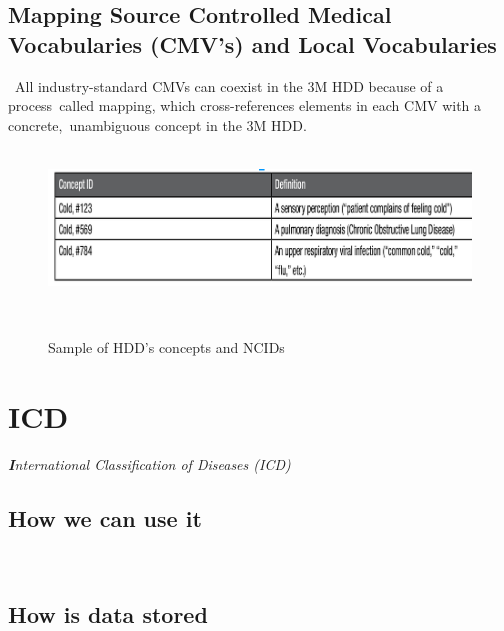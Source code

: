 \documentclass[DIV=calc, paper=a4, fontsize=12pt, onecolumn]{scrartcl}	 %
\newcommand{\initial}[1]{ %
\lettrine[lines=3,lhang=0.3,nindent=0em,slope=0em]{
\color{DarkBlue}
{\textbf{\textit{#1}}}}{}}
\begin{document}
  \subsection{Mapping Source Controlled Medical Vocabularies (CMV's) and Local Vocabularies}\
  All industry-standard CMVs can coexist in the 3M HDD because of a process\
  called mapping, which cross-references elements in each CMV with a concrete,\
  unambiguous concept in the 3M HDD.\\
  \citep{_3M_HDD_Product_Overview_2010}\

  \begin{figure}[ht!]
    \label{fig:cid}
    \centering
    \includegraphics[scale=0.4]{conceptid.png}
    \caption{Sample of HDD's concepts and NCIDs}\
    \citep{_3M_HDD_Product_Overview_2010}\
  \end{figure}  



  \section[International Classification of Diseases (ICD) ]{ICD}
  \label{sec:icd}

  \initial{I}\textit{nternational Classification of Diseases (ICD)}\\

  \subsection{How we can use it}\


  \subsection{How is data stored}\

\end{document}
